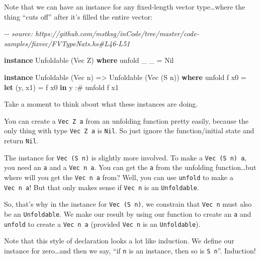 \documentclass[]{article}
\newenvironment{Shaded}{}{}
\newcommand{\CommentTok}[1]{\textcolor[rgb]{0.38,0.63,0.69}{\textit{#1}}}
\newcommand{\DataTypeTok}[1]{\textcolor[rgb]{0.56,0.13,0.00}{#1}}
\newcommand{\KeywordTok}[1]{\textcolor[rgb]{0.00,0.44,0.13}{\textbf{#1}}}
\newcommand{\NormalTok}[1]{#1}
\newcommand{\OperatorTok}[1]{\textcolor[rgb]{0.40,0.40,0.40}{#1}}
\newcommand{\OtherTok}[1]{\textcolor[rgb]{0.00,0.44,0.13}{#1}}
\begin{document}
Note that we can have an instance for any fixed-length vector type\ldots where
the thing ``cuts off'' after it's filled the entire vector:

\begin{Shaded}
\begin{Highlighting}[]
\CommentTok{{-}{-} source: https://github.com/mstksg/inCode/tree/master/code{-}samples/fixvec/FVTypeNats.hs\#L46{-}L51}

\KeywordTok{instance} \DataTypeTok{Unfoldable}\NormalTok{ (}\DataTypeTok{Vec} \DataTypeTok{Z}\NormalTok{) }\KeywordTok{where}
\NormalTok{    unfold \_ \_ }\OtherTok{=} \DataTypeTok{Nil}

\KeywordTok{instance} \DataTypeTok{Unfoldable}\NormalTok{ (}\DataTypeTok{Vec}\NormalTok{ n) }\OtherTok{=>} \DataTypeTok{Unfoldable}\NormalTok{ (}\DataTypeTok{Vec}\NormalTok{ (}\DataTypeTok{S}\NormalTok{ n)) }\KeywordTok{where}
\NormalTok{    unfold f x0 }\OtherTok{=} \KeywordTok{let}\NormalTok{ (y, x1) }\OtherTok{=}\NormalTok{ f x0}
                  \KeywordTok{in}\NormalTok{  y }\OperatorTok{:\#}\NormalTok{ unfold f x1}
\end{Highlighting}
\end{Shaded}

Take a moment to think about what these instances are doing.

You can create a \texttt{Vec\ Z\ a} from an unfolding function pretty easily,
because the only thing with type \texttt{Vec\ Z\ a} is \texttt{Nil}. So just
ignore the function/initial state and return \texttt{Nil}.

The instance for \texttt{Vec\ (S\ n)} is slightly more involved. To make a
\texttt{Vec\ (S\ n)\ a}, you need an \texttt{a} and a \texttt{Vec\ n\ a}. You
can get the \texttt{a} from the unfolding function\ldots but where will you get
the \texttt{Vec\ n\ a} from? Well, you can use \texttt{unfold} to make a
\texttt{Vec\ n\ a}! But that only makes sense if \texttt{Vec\ n} is an
\texttt{Unfoldable}.

So, that's why in the instance for \texttt{Vec\ (S\ n)}, we constrain that
\texttt{Vec\ n} must also be an \texttt{Unfoldable}. We make our result by using
our function to create an \texttt{a} and \texttt{unfold} to create a
\texttt{Vec\ n\ a} (provided \texttt{Vec\ n} is an \texttt{Unfoldable}).

Note that this style of declaration looks a lot like induction. We define our
instance for zero\ldots and then we say, ``if \texttt{n} is an instance, then so
is \texttt{S\ n}''. Induction!
\end{document}
